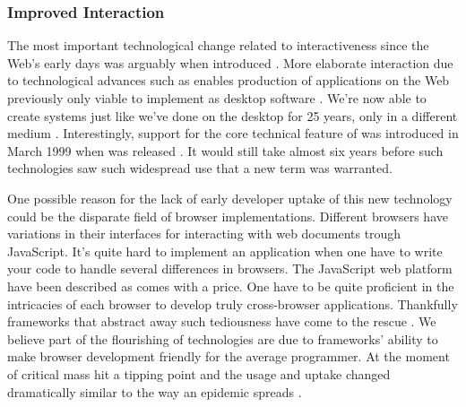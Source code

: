 \subsubsection{Improved Interaction}
The most important
technological change related to interactiveness since the Web's early days was
arguably when \citet{garrett05} introduced %
.
More elaborate interaction due to technological advances such as 
enables production of applications on the Web previously only viable to
implement as desktop software .
We're now able to create systems just like we've done on the desktop for 25
years, only in a different medium \citep[]{arnowitz07}.
Interestingly, support for the core technical feature of  was
introduced in March 1999 when 
was released \citep{microsoft99}. It would still take almost six years before
such technologies saw such widespread use that a new term was warranted.

One possible reason for the lack of early developer uptake of this new
technology could be the disparate field of browser implementations.
Different browsers have variations in their interfaces for interacting with
web documents trough JavaScript. It's quite hard to implement an application
when one have to write your code to handle several differences in browsers.
The JavaScript web platform have been described as
 comes with a price. One have to be quite proficient in the
intricacies of each browser to develop truly cross-browser applications.
Thankfully frameworks that abstract away such tediousness have come to
the rescue \citet[]{mesbah07}. We believe part of the flourishing of
 technologies are due to frameworks' ability to make browser
development friendly for the average programmer. At the moment of critical
mass  hit a tipping point and the usage and uptake changed
dramatically similar to the way an epidemic spreads
\citep[]{gladwell02}.

